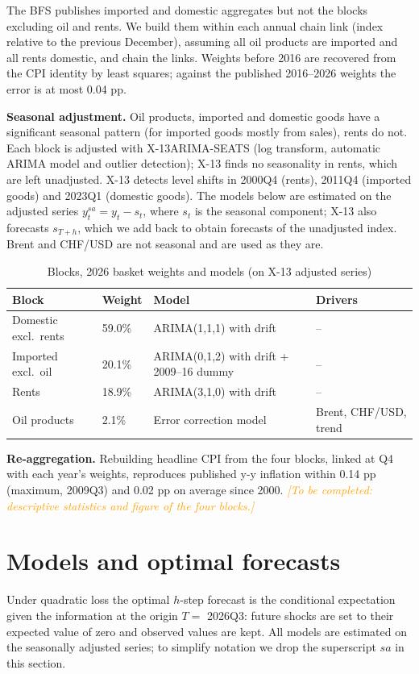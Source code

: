 \documentclass[11pt,a4paper]{article}
\newcommand{\todo}[1]{\textcolor{orange}{\textit{[#1]}}}
\begin{document}
The BFS publishes imported and domestic aggregates but not the blocks excluding oil and rents. We
build them within each annual chain link (index relative to the previous December), assuming all oil
products are imported and all rents domestic, and chain the links. Weights before 2016 are recovered
from the CPI identity by least squares; against the published 2016--2026 weights the error is at most
0.04 pp.

\textbf{Seasonal adjustment.} Oil products, imported and domestic goods have a significant seasonal
pattern (for imported goods mostly from sales), rents do not. Each block is adjusted with
X-13ARIMA-SEATS (log transform, automatic ARIMA model and outlier detection); X-13 finds no
seasonality in rents, which are left unadjusted. X-13 detects level shifts in 2000Q4 (rents), 2011Q4
(imported goods) and 2023Q1 (domestic goods). The models below are estimated on the adjusted series
$y^{sa}_t = y_t - s_t$, where $s_t$ is the seasonal component; X-13 also forecasts $s_{T+h}$, which we
add back to obtain forecasts of the unadjusted index. Brent and CHF/USD are not seasonal and are used
as they are.

\begin{table}[h]
  \centering\small
  \caption{Blocks, 2026 basket weights and models (on X-13 adjusted series)}\label{tab:blocks}
  \begin{tabular}{@{}llll@{}}
    \toprule
    Block & Weight & Model & Drivers \\
    \midrule
    Domestic excl.\ rents & 59.0\% & ARIMA(1,1,1) with drift & -- \\
    Imported excl.\ oil   & 20.1\% & ARIMA(0,1,2) with drift + 2009--16 dummy & -- \\
    Rents                 & 18.9\% & ARIMA(3,1,0) with drift & -- \\
    Oil products          &  2.1\% & Error correction model & Brent, CHF/USD, trend \\
    \bottomrule
  \end{tabular}
\end{table}

\textbf{Re-aggregation.} Rebuilding headline CPI from the four blocks, linked at Q4 with each year's
weights, reproduces published y-y inflation within 0.14 pp (maximum, 2009Q3) and 0.02 pp on average
since 2000.
\todo{To be completed: descriptive statistics and figure of the four blocks.}

\section{Models and optimal forecasts}\label{sec:models}
Under quadratic loss the optimal $h$-step forecast is the conditional expectation given the
information at the origin $T = $ 2026Q3: future shocks are set to their expected value of zero and
observed values are kept. All models are estimated on the seasonally adjusted series; to simplify
notation we drop the superscript $sa$ in this section.
\end{document}
